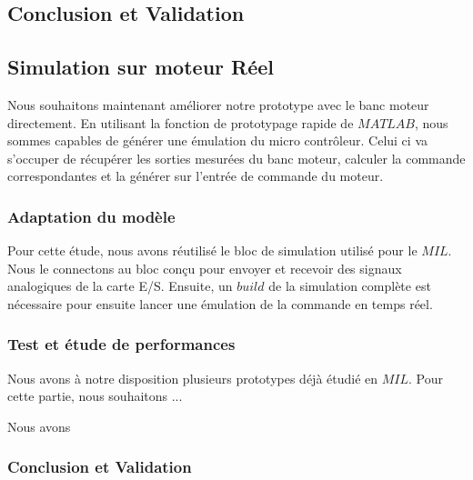 		
		\subsection{Conclusion et Validation}
	\subsection{Simulation sur moteur Réel}
		Nous souhaitons maintenant améliorer notre prototype avec le banc moteur directement. En utilisant la fonction de prototypage rapide de $MATLAB$, nous sommes capables de générer une émulation du micro contrôleur. Celui ci va s'occuper de récupérer les sorties mesurées du banc moteur, calculer la commande correspondantes et la générer sur l'entrée de commande du moteur. 
		\subsubsection{Adaptation du modèle}
		Pour cette étude, nous avons réutilisé le bloc de simulation utilisé pour le $MIL$. Nous le connectons au bloc conçu pour envoyer et recevoir des signaux analogiques de la carte E/S. Ensuite, un $build$ de la simulation complète est nécessaire pour ensuite lancer une émulation de la commande en temps réel.
		\subsubsection{Test et étude de performances}
		Nous avons à notre disposition plusieurs prototypes déjà étudié en $MIL$. Pour cette partie, nous souhaitons ...
		
		Nous avons 
		\subsubsection{Conclusion et Validation}
		
